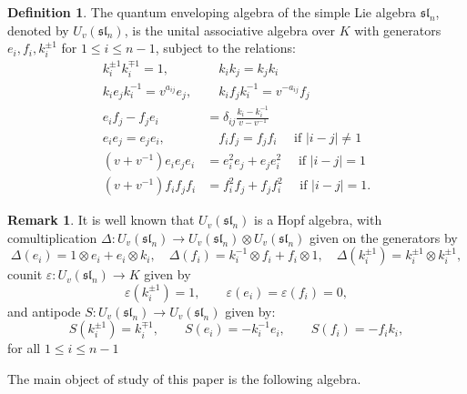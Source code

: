 \documentclass{amsart}
\numberwithin{equation}{section}
\theoremstyle{theorem}
\theoremstyle{definition}
\newtheorem{remark}[theorem]{Remark}
\newtheorem{definition}[theorem]{Definition}
\newcommand{\sll}{\mathfrak{sl}}
\newcommand{\uvsln}{U_v(\sll_n)}
\begin{document}
\begin{definition}\label{def:uvsln}
The quantum enveloping algebra of the simple Lie algebra $\sll_n$, denoted by $\uvsln$, is the unital associative algebra over $K$ with generators $e_i, f_i, k_i^{\pm1}$ for $1\leq i \leq n-1$, subject to the relations:
\begin{align}\label{eq:usln.1} k_i^{\pm1}k_i^{\mp1}=1, & \quad k_ik_j=k_jk_i \\
\label{eq:usln.2} k_ie_jk_i^{-1} = v^{a_{ij}}e_j, & \quad k_if_jk_i^{-1} = v^{-a_{ij}}f_j\\
\label{eq:usln.3} e_if_j-f_je_i & =  \delta_{ij}\frac{k_i-k_i^{-1}}{v-v^{-1}}\\
\label{eq:usln.4} e_ie_j=e_je_i, & \quad f_if_j=f_jf_i \quad\text{ if }|i-j| \neq 1 \\
\label{eq:usln.5} (v+v^{-1})e_ie_je_i & =  e_i^2e_j + e_je_i^2 \quad\text{ if }|i-j| = 1\\
\label{eq:usln.6} (v+v^{-1})f_if_jf_i & =  f_i^2f_j + f_jf_i^2 \quad\text{ if }|i-j| = 1.\end{align}
\end{definition}

\begin{remark}
It is well known that $\uvsln$ is a Hopf algebra, with comultiplication $\Delta:\uvsln\to \uvsln\otimes \uvsln$ given on the generators by 
\[\Delta(e_i) = 1\otimes e_i + e_i\otimes k_i,\quad\Delta(f_i) = k_i^{-1}\otimes f_i + f_i\otimes 1,\quad\Delta(k_i^{\pm 1}) = k_i^{\pm 1}\otimes k_i^{\pm 1},\]
counit $\varepsilon:\uvsln\to K$ given by
\[\varepsilon(k_i^{\pm 1})=1,\qquad \varepsilon(e_i)=\varepsilon(f_i)=0,\]
and antipode $S:\uvsln\to \uvsln$ given by:
\[S(k_i^{\pm 1})=k_i^{\mp1},\qquad S(e_i)=-k_i^{-1}e_i, \qquad S(f_i)=-f_ik_i,\]
for all $1\leq i\leq n-1$
\end{remark}

The main object of study of this paper is the following algebra.
\end{document}

